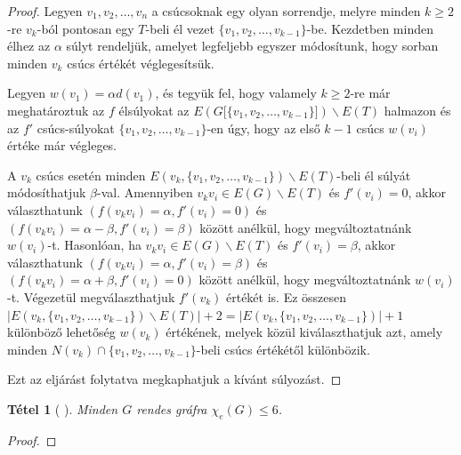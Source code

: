 \documentclass[12pt, a4paper]{report}
\newtheorem{tét}{Tétel}[section]
\theoremstyle{remark}
\theoremstyle{definition}
\begin{document}
\begin{proof}
Legyen $v_1, v_2, \ldots, v_n$ a csúcsoknak egy olyan sorrendje, melyre minden $k \geq 2$-re $v_k$-ból pontosan egy $T$-beli él vezet $\lbrace v_1, v_2, \ldots, v_{k - 1} \rbrace$-be. Kezdetben minden élhez az $\alpha$ súlyt rendeljük, amelyet legfeljebb egyszer módosítunk, hogy sorban minden $v_k$ csúcs értékét véglegesítsük.

Legyen $w(v_1) = \alpha d(v_1)$, és tegyük fel, hogy valamely $k \geq 2$-re már meghatároztuk az $f$ élsúlyokat az $E(G\lbrack \lbrace v_1, v_2, \ldots, v_{k - 1} \rbrace \rbrack) \smallsetminus E(T)$ halmazon és az $f'$ csúcs-súlyokat $\lbrace v_1, v_2, \ldots, v_{k - 1} \rbrace$-en úgy, hogy az első $k - 1$ csúcs $w(v_i)$ értéke már végleges.

A $v_k$ csúcs esetén minden $E(v_k, \lbrace v_1, v_2, \ldots, v_{k - 1} \rbrace) \smallsetminus E(T)$-beli él súlyát módosíthatjuk $\beta$-val. Amennyiben $v_k v_i \in E(G) \smallsetminus E(T)$ és $f'(v_i) = 0$, akkor választhatunk $(f(v_k v_i) = \alpha, f'(v_i) = 0)$ és $(f(v_k v_i) = \alpha - \beta, f'(v_i) = \beta)$ között anélkül, hogy megváltoztatnánk $w(v_i)$-t. Hasonlóan, ha $v_k v_i \in E(G) \smallsetminus E(T)$ és $f'(v_i) = \beta$, akkor választhatunk $(f(v_k v_i) = \alpha, f'(v_i) = \beta)$ és $(f(v_k v_i) = \alpha + \beta, f'(v_i) = 0)$ között anélkül, hogy megváltoztatnánk $w(v_i)$-t. Végezetül megválaszthatjuk $f'(v_k)$ értékét is. Ez összesen $|E(v_k, \lbrace v_1, v_2, \ldots, v_{k - 1} \rbrace) \smallsetminus E(T)| + 2 = |E(v_k, \lbrace v_1, v_2, \ldots, v_{k - 1} \rbrace)| + 1$ különböző lehetőség $w(v_k)$ értékének, melyek közül kiválaszthatjuk azt, amely minden $N(v_k) \cap \lbrace v_1, v_2, \ldots, v_{k - 1} \rbrace$-beli csúcs értékétől különbözik.

Ezt az eljárást folytatva megkaphatjuk a kívánt súlyozást.
\end{proof}

\begin{tét}[\citeauthor{Kalkowski2009} \cite{Kalkowski2009}]
Minden $G$ rendes gráfra $\chi_e(G) \leq 6$.
\end{tét}

\begin{proof}

\end{proof}

\nocite{*}
\printbibliography
\end{document}
